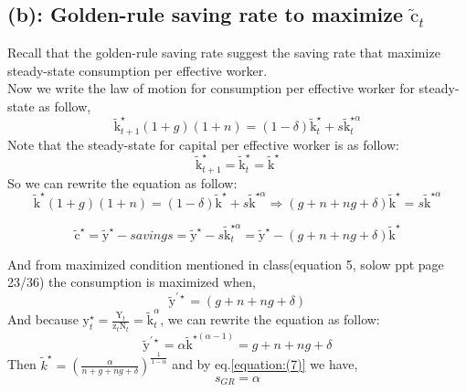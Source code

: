 \documentclass[12pt]{article}
\begin{document}
\subsection*{(b): Golden-rule saving rate to maximize $\tilde{\mathrm{c}}_t$}
Recall that the golden-rule saving rate suggest the saving rate that maximize steady-state consumption per effective worker. \\
Now we write the law of motion for consumption per effective worker for steady-state as follow,
\begin{equation}
    \tilde{\mathrm{k}}_{t+1}^{\star}(1+g)(1+n) = (1-\delta)\tilde{\mathrm{k}}_t^{\star} + s\tilde{\mathrm{k}}_t^{\star\alpha}
\end{equation}
Note that the steady-state for capital per effective worker is as follow:
\begin{equation}
    \tilde{\mathrm{k}}_{t+1}^{\star} = \tilde{\mathrm{k}}_{t}^{\star} = \tilde{\mathrm{k}}^{\star}
    \label{equation:(5)}
\end{equation}
So we can rewrite the equation as follow:
\begin{equation}
    \tilde{\mathrm{k}}^{\star}(1+g)(1+n) = (1-\delta)\tilde{\mathrm{k}}^{\star} + s\tilde{\mathrm{k}}^{\star\alpha} \Rightarrow (g+n+ng+\delta)\tilde{\mathrm{k}}^{\star} =  s\tilde{\mathrm{k}}^{\star\alpha} 
    \label{equation:(6)}
\end{equation}

\begin{equation}
    \tilde{\mathrm{c}}^{\star} = \tilde{\mathrm{y}}^{\star} - savings =  \tilde{\mathrm{y}}^{\star} - s\tilde{\mathrm{k}}_t^{\star\alpha} = \tilde{\mathrm{y}}^{\star} - (g+n+ng+\delta)\tilde{\mathrm{k}}^{\star} 
\end{equation}

And from maximized condition mentioned in class(equation 5, solow ppt page 23/36) the consumption is maximized when,
\begin{equation}
    \tilde{\mathrm{y}}^{\prime\star} = (g+n+ng+\delta)
\end{equation}
And because $\mathrm{y}_t^{\star} = \frac{\mathrm{Y}_t}{\mathrm{z}_{t}\mathrm{N}_{t}} = \tilde{\mathrm{k}}_t^{\alpha}$, we can rewrite the equation as follow:
\begin{equation}
    \tilde{\mathrm{y}}^{\prime\star} = \alpha\tilde{\mathrm{k}}^{\star(\alpha-1)} = g+n+ng+\delta
    \label{equation:(7)}
\end{equation} 
Then $\tilde{k}^{\star} = (\frac{\alpha}{n+g+ng+\delta})^{\frac{1}{1-\alpha}}$ and by eq.\ref{equation:(7)} we have,
\begin{equation*}
    s_{GR} = \alpha
\end{equation*}
\end{document}

